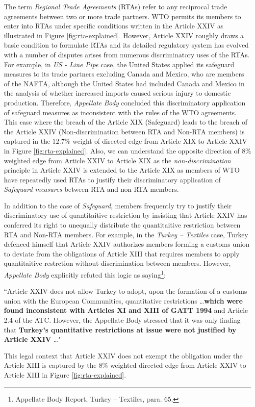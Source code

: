 The term \textit{Regional Trade Agreements} (RTAs)
refer to any reciprocal trade agreements between two or more trade partners. 
WTO permits its members to enter into RTAs under specific conditions written in the Article XXIV
as illustrated in 
Figure \ref{fig:rta-explained}.
However, Article XXIV roughly draws a basic condition to formulate RTAs and its 
detailed regulatory system has evolved with a number of disputes arises 
from numerous discriminatory uses of the RTAs. For example,
in \textit{US - Line Pipe} case, 
the United States applied its safeguard measures to its trade partners excluding Canada and Mexico, who are members of the NAFTA, although 
the United States had included Canada and Mexico in the analysis of whether increased imports caused serious injury to domestic production.
Therefore, \textit{Appellate Body} concluded this discriminatory application of safeguard measures as inconsistent with the rules of the WTO agreements. 
This case where the breach of the Article XIX (Safeguard) leads to the breach of the Article XXIV (Non-discrimination between RTA and Non-RTA members)
is captured in the $12.7\%$ weight of directed edge from Article XIX to Article XXIV in Figure \ref{fig:rta-explained}.
Also, we can understand the opposite direction of $8\%$ weighted edge from Article XXIV to Article XIX as the \textit{non-discrimination} 
principle in Article XXIV is 
extended to the Article XIX as members of WTO have repeatedly used RTAs to justify their discriminatory application of \textit{Safeguard measures} between RTA and non-RTA members.%

In addition to the case of \textit{Safeguard}, 
members frequently try to justify their discriminatory 
use of quantitaitive restriction by insisting that Article XXIV 
has conferred its right to unequally distribute the quantitaitive restriction between RTA and Non-RTA members.
For example, in the \textit{Turkey – Textiles} case, Turkey defenced himself that Article XXIV authorizes
members forming a customs union to deviate from the obligations of Article XIII that requires members to apply quantitaitive restrction without discrimination between members. 
However, \textit{Appellate Body} explicitly refuted this logic as saying\footnote{Appellate Body Report, Turkey – Textiles, para. 65.}:
\begin{displayquote}[][]
    ``Article XXIV does not allow Turkey to adopt, upon the
    formation of a customs union with the European Communities, quantitative restrictions \ldots \textbf{which
    were found inconsistent with Articles XI and XIII of GATT 1994} and Article 2.4 of the ATC.
    However, the Appellate Body stressed that it was only finding that \textbf{Turkey's quantitative
    restrictions at issue were not justified by Article XXIV} \ldots"
\end{displayquote}
This legal context that Article XXIV does not exempt the obligation under the Article XIII is captured by the $8\%$ weighted directed edge from Article XXIV to Article XIII in Figure \ref{fig:rta-explained}.

